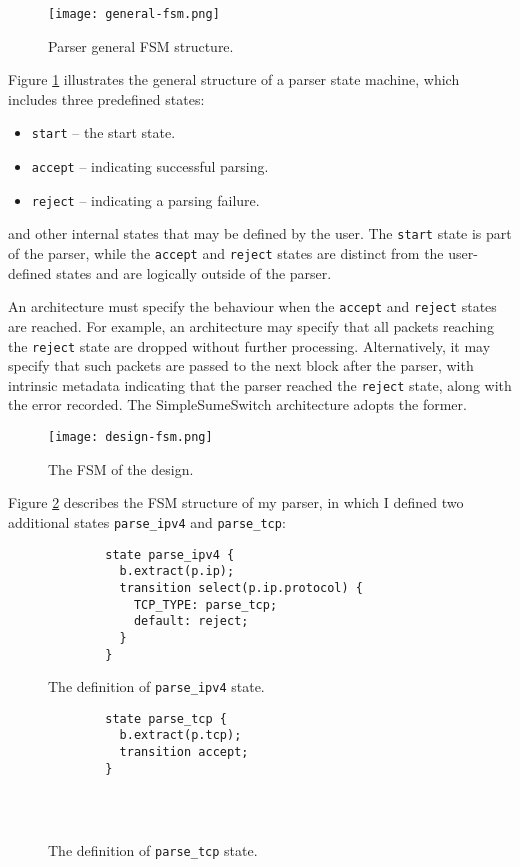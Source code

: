 \begin{figure}[h]
	\centering
	\texttt{[image: general-fsm.png]}
	\caption{Parser general FSM structure.}
	\label{general-fsm}
\end{figure}
 
Figure \ref{general-fsm} illustrates the general structure of a parser state machine, which includes three predefined states: 
\begin{itemize}
	\item \texttt{start} -- the start state.
	\item \texttt{accept} -- indicating successful parsing.
	\item \texttt{reject} -- indicating a parsing failure.
\end{itemize}
and other internal states that may be defined by the user. The \texttt{start} state is part of the parser, while the \texttt{accept} and \texttt{reject} states are distinct from the user-defined states and are logically outside of the parser. 

An architecture must specify the behaviour when the \texttt{accept} and \texttt{reject} states are reached. For example, an architecture may specify that all packets reaching the \texttt{reject} state are dropped without further processing. Alternatively, it may specify that such packets are passed to the next block after the parser, with intrinsic metadata indicating that the parser reached the \texttt{reject} state, along with the error recorded. The SimpleSumeSwitch architecture adopts the former.

\begin{figure}[h]
	\centering
	\texttt{[image: design-fsm.png]}
	\caption{The FSM of the design.}
	\label{design-fsm}
\end{figure}

Figure \ref{design-fsm} describes the FSM structure of my parser, in which I defined two additional states \texttt{parse\_ipv4} and \texttt{parse\_tcp}:

\begin{figure}[!ht]
	\begin{minipage}{.48\textwidth}
		{\renewcommand{\baselinestretch}{0.8}\small
		\begin{verbatim}
		state parse_ipv4 {
		  b.extract(p.ip);
		  transition select(p.ip.protocol) {
		    TCP_TYPE: parse_tcp;
		    default: reject;
		  }
		}
		\end{verbatim}
		}
 		\caption{The definition of \texttt{parse\_ipv4} state.}
	\end{minipage}
	\hfill
	\begin{minipage}{.48\textwidth}
		{\renewcommand{\baselinestretch}{0.8}\small
		\begin{verbatim}
		state parse_tcp {
		  b.extract(p.tcp);
		  transition accept;
		}
		    
		    
		    
		\end{verbatim}
		}	
		\caption{The definition of \texttt{parse\_tcp} state.}
	\end{minipage}
\end{figure}

